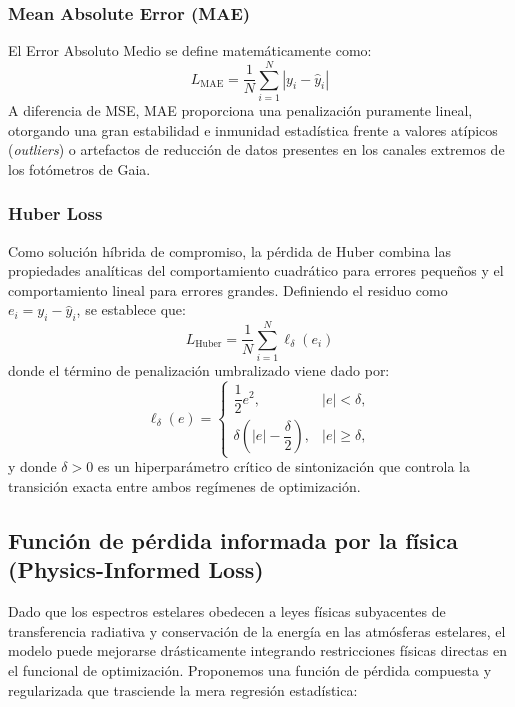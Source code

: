 \documentclass{article}
\begin{document}
\subsubsection{Mean Absolute Error (MAE)}
El Error Absoluto Medio se define matemáticamente como:
\begin{equation}
L_{\mathrm{MAE}} = \frac{1}{N} \sum_{i=1}^{N} |y_i-\hat{y}_i|
\end{equation}
A diferencia de MSE, MAE proporciona una penalización puramente lineal, otorgando una gran estabilidad e inmunidad estadística frente a valores atípicos (\textit{outliers}) o artefactos de reducción de datos presentes en los canales extremos de los fotómetros de Gaia.

\subsubsection{Huber Loss}
Como solución híbrida de compromiso, la pérdida de Huber combina las propiedades analíticas del comportamiento cuadrático para errores pequeños y el comportamiento lineal para errores grandes. Definiendo el residuo como $e_i = y_i - \hat{y}_i$, se establece que:
\begin{equation}
L_{\mathrm{Huber}} = \frac{1}{N} \sum_{i=1}^{N} \ell_{\delta}(e_i)
\end{equation}
donde el término de penalización umbralizado viene dado por:
\begin{equation}
\ell_{\delta}(e)=
\begin{cases}
\dfrac{1}{2}e^{2}, & |e|<\delta, \\[0.3cm]
\delta\left(|e|-\dfrac{\delta}{2}\right), & |e|\geq\delta,
\end{cases}
\end{equation}
y donde $\delta > 0$ es un hiperparámetro crítico de sintonización que controla la transición exacta entre ambos regímenes de optimización.

\subsection{Función de pérdida informada por la física (Physics-Informed Loss)}

Dado que los espectros estelares obedecen a leyes físicas subyacentes de transferencia radiativa y conservación de la energía en las atmósferas estelares, el modelo puede mejorarse drásticamente integrando restricciones físicas directas en el funcional de optimización. Proponemos una función de pérdida compuesta y regularizada que trasciende la mera regresión estadística:
\end{document}
